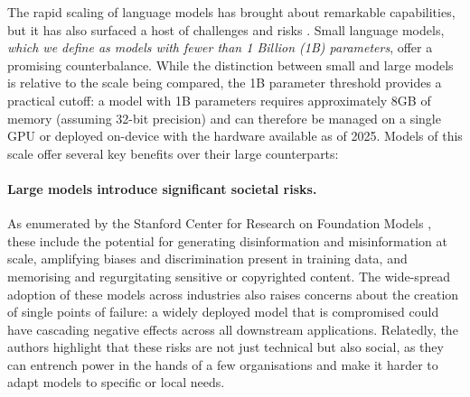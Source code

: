 
The rapid scaling of language models has brought about remarkable capabilities, but it has also surfaced a host of challenges and risks \citep{bommasani2021foundation}. Small language models, \textit{which we define as models with fewer than 1 Billion (1B) parameters}, offer a promising counterbalance. While the distinction between small and large models is relative to the scale being compared, the 1B parameter threshold provides a practical cutoff: a model with 1B parameters requires approximately 8GB of memory (assuming 32-bit precision) and can therefore be managed on a single GPU or deployed on-device with the hardware available as of 2025. Models of this scale offer several key benefits over their large counterparts:

\paragraph{Large models introduce significant societal risks.} As enumerated by the Stanford Center for Research on Foundation Models \citep{bommasani2021foundation}, these include the potential for generating disinformation and misinformation at scale, amplifying biases and discrimination present in training data, and memorising and regurgitating sensitive or copyrighted content. The wide-spread adoption of these models across industries also raises concerns about the creation of single points of failure: a widely deployed model that is compromised could have cascading negative effects across all downstream applications. Relatedly, the authors highlight that these risks are not just technical but also social, as they can entrench power in the hands of a few organisations and make it harder to adapt models to specific or local needs.

